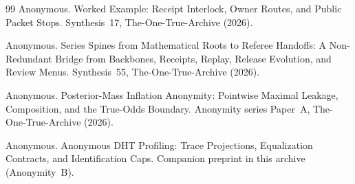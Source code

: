 \documentclass[11pt]{article}
\begin{document}
\begin{thebibliography}{99}
Anonymous.
\newblock Worked Example: Receipt Interlock, Owner Routes, and Public Packet Stops.
\newblock Synthesis~17, The-One-True-Archive (2026).

Anonymous.
\newblock Series Spines from Mathematical Roots to Referee Handoffs: A Non-Redundant Bridge from Backbones, Receipts, Replay, Release Evolution, and Review Menus.
\newblock Synthesis~55, The-One-True-Archive (2026).



Anonymous.
\newblock Posterior-Mass Inflation Anonymity: Pointwise Maximal Leakage, Composition, and the True-Odds Boundary.
\newblock Anonymity series Paper~A, The-One-True-Archive (2026).

Anonymous.
\newblock Anonymous DHT Profiling: Trace Projections, Equalization Contracts, and Identification Caps.
\newblock Companion preprint in this archive (Anonymity~B).

\end{thebibliography}
\end{document}
